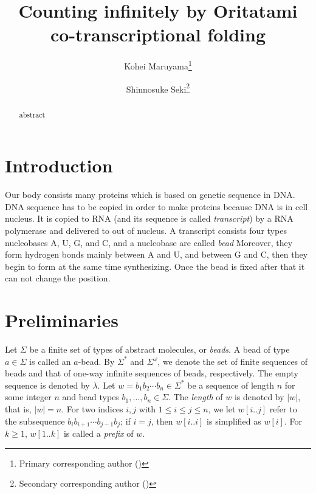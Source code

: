 \documentclass[runningheads]{llncs}
\title{Counting infinitely by Oritatami co-transcriptional folding}
\author{
Kohei Maruyama\inst{1}\thanks{Primary corresponding author (\email{k.maruyama@uec.ac.jp})} \and
Shinnosuke Seki\inst{1}\thanks{Secondary corresponding author (\email{s.seki@uec.ac.jp})}
}
\institute{
The University of Electro-Communications, 
1-5-1 Chofugaoka, Chofu, Tokyo, 1828585, Japan \\
}
\begin{document}
\maketitle

\begin{abstract}
abstract
\end{abstract}

	\section{Introduction}
Our body consists many proteins which is based on genetic sequence in DNA.
DNA sequence has to be copied in order to make proteins because DNA is in cell nucleus.
It is copied to RNA (and its sequence is called \textit{transcript}) by a RNA polymerase and delivered to out of nucleus.
A transcript consists four types nucleobases A, U, G, and C, and a nucleobase are called \textit{bead}
Moreover, they form hydrogen bonds mainly between A and U, and between G and C, then they begin to form at the same time synthesizing.
Once the bead is fixed after that it can not change the position.






	\section{Preliminaries}


Let $\Sigma$ be a finite set of types of abstract molecules, or \textit{beads}. 
A bead of type $a \in \Sigma$ is called an $a$-bead. 
By $\Sigma^*$ and $\Sigma^\omega$, we denote the set of finite sequences of beads and that of one-way infinite sequences of beads, respectively. 
The empty sequence is denoted by $\lambda$. 
Let $w = b_1 b_2 \cdots b_n \in \Sigma^*$ be a sequence of length $n$ for some integer $n$ and bead types $b_1, \ldots, b_n \in \Sigma$. 
The \textit{length} of $w$ is denoted by $|w|$, that is, $|w| = n$. %
For two indices $i, j$ with $1 \le i \le j \le n$, we let $w[i..j]$ refer to the subsequence $b_i b_{i+1} \cdots b_{j-1}b_j$; if $i = j$, then $w[i..i]$ is simplified as $w[i]$. 
For $k \ge 1$, $w[1..k]$ is called a \textit{prefix} of $w$. 
\end{document}
